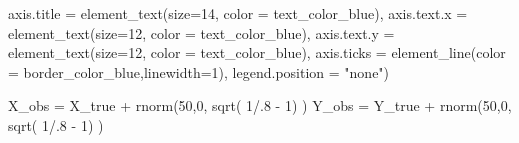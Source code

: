 \documentclass[
  letterpaper,
  DIV=11,
  numbers=noendperiod]{scrreprt}
\newenvironment{Shaded}{\begin{snugshade}}{\end{snugshade}}
\newcommand{\AttributeTok}[1]{\textcolor[rgb]{0.40,0.45,0.13}{#1}}
\newcommand{\DecValTok}[1]{\textcolor[rgb]{0.68,0.00,0.00}{#1}}
\newcommand{\FunctionTok}[1]{\textcolor[rgb]{0.28,0.35,0.67}{#1}}
\newcommand{\NormalTok}[1]{\textcolor[rgb]{0.00,0.23,0.31}{#1}}
\newcommand{\OtherTok}[1]{\textcolor[rgb]{0.00,0.23,0.31}{#1}}
\newcommand{\SpecialCharTok}[1]{\textcolor[rgb]{0.37,0.37,0.37}{#1}}
\newcommand{\StringTok}[1]{\textcolor[rgb]{0.13,0.47,0.30}{#1}}
\begin{document}
\begin{Shaded}
\begin{Highlighting}[]
          \AttributeTok{axis.title =} \FunctionTok{element\_text}\NormalTok{(}\AttributeTok{size=}\DecValTok{14}\NormalTok{, }\AttributeTok{color =}\NormalTok{ text\_color\_blue),}
          \AttributeTok{axis.text.x =} \FunctionTok{element\_text}\NormalTok{(}\AttributeTok{size=}\DecValTok{12}\NormalTok{, }\AttributeTok{color =}\NormalTok{ text\_color\_blue),}
          \AttributeTok{axis.text.y =} \FunctionTok{element\_text}\NormalTok{(}\AttributeTok{size=}\DecValTok{12}\NormalTok{, }\AttributeTok{color =}\NormalTok{ text\_color\_blue),}
          \AttributeTok{axis.ticks =} \FunctionTok{element\_line}\NormalTok{(}\AttributeTok{color =}\NormalTok{ border\_color\_blue,}\AttributeTok{linewidth=}\DecValTok{1}\NormalTok{),}
          \AttributeTok{legend.position =} \StringTok{"none"}\NormalTok{) }

\NormalTok{X\_obs }\OtherTok{=}\NormalTok{ X\_true }\SpecialCharTok{+} \FunctionTok{rnorm}\NormalTok{(}\DecValTok{50}\NormalTok{,}\DecValTok{0}\NormalTok{, }\FunctionTok{sqrt}\NormalTok{( }\DecValTok{1}\SpecialCharTok{/}\NormalTok{.}\DecValTok{8} \SpecialCharTok{{-}} \DecValTok{1}\NormalTok{) )}
\NormalTok{Y\_obs }\OtherTok{=}\NormalTok{ Y\_true }\SpecialCharTok{+} \FunctionTok{rnorm}\NormalTok{(}\DecValTok{50}\NormalTok{,}\DecValTok{0}\NormalTok{, }\FunctionTok{sqrt}\NormalTok{( }\DecValTok{1}\SpecialCharTok{/}\NormalTok{.}\DecValTok{8} \SpecialCharTok{{-}} \DecValTok{1}\NormalTok{) )}


\end{Highlighting}
\end{Shaded}
\end{document}
